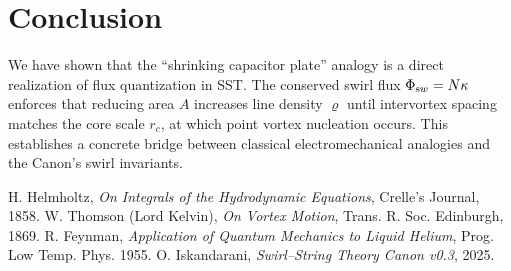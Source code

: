 \documentclass[11pt,a4paper]{article}
\begin{document}
\section{Conclusion}
    We have shown that the ``shrinking capacitor plate'' analogy is a direct realization of flux quantization in SST. The conserved swirl flux $\Phi_{\textrm sw}=N\kappa$ enforces that reducing area $A$ increases line density $\bm{\varrho}$ until intervortex spacing matches the core scale $r_c$, at which point vortex nucleation occurs. This establishes a concrete bridge between classical electromechanical analogies and the Canon's swirl invariants.

    
    \begin{thebibliography}{9}
     H. Helmholtz, \emph{On Integrals of the Hydrodynamic Equations}, Crelle’s Journal, 1858.
     W. Thomson (Lord Kelvin), \emph{On Vortex Motion}, Trans. R. Soc. Edinburgh, 1869.
     R. Feynman, \emph{Application of Quantum Mechanics to Liquid Helium}, Prog. Low Temp. Phys. 1955.
     O. Iskandarani, \emph{Swirl--String Theory Canon v0.3}, 2025.
    \end{thebibliography}
\end{document}

